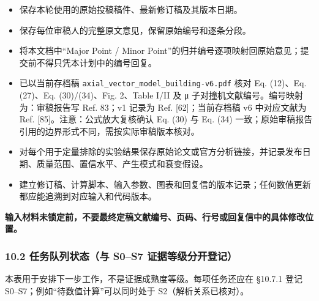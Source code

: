 \documentclass[
]{article}
\providecommand{\tightlist}{%
  \setlength{\itemsep}{0pt}\setlength{\parskip}{0pt}}
\begin{document}
\begin{itemize}
\tightlist
\item[$\square$]
  保存本轮使用的原始投稿稿件、最新修订稿及其版本日期。
\item[$\square$]
  保存每位审稿人的完整原文意见，保留原始编号和逐条分段。
\item[$\square$]
  将本文档中``Major Point / Minor
  Point''的归并编号逐项映射回原始意见；提交前不得只凭本计划中的编号回复。
\item[$\boxtimes$]
  已以当前存档稿 \texttt{axial\_vector\_model\_building-v6.pdf} 核对 Eq.
  (12)、Eq. (27)、Eq. (30)/(34)、Fig. 2、Table I/II 及 μ
  子对撞机文献编号。编号映射为：审稿报告写 Ref. 83；v1 记录为 Ref.
  {[}62{]}；当前存档稿 v6 中对应文献为 Ref.
  {[}85{]}。注意：公式放大复核确认 Eq. (30) 与 Eq. (34)
  一致；原始审稿报告引用的边界形式不同，需按实际审稿版本核对。
\item[$\square$]
  对每个用于定量排除的实验结果保存原始论文或官方分析链接，并记录发布日期、质量范围、置信水平、产生模式和衰变假设。
\item[$\square$]
  建立修订稿、计算脚本、输入参数、图表和回复信的版本记录；任何数值更新都应能追溯到对应输入和代码版本。
\end{itemize}

\textbf{输入材料未锁定前，不要最终定稿文献编号、页码、行号或回复信中的具体修改位置。}

\subsubsection{10.2 任务队列状态（与 S0--S7
证据等级分开登记）}\label{ux4efbux52a1ux961fux5217ux72b6ux6001ux4e0e-s0s7-ux8bc1ux636eux7b49ux7ea7ux5206ux5f00ux767bux8bb0}

本表用于安排下一步工作，不是证据成熟度等级。每项任务还应在 §10.7.1 登记
S0--S7；例如``待数值计算''可以同时处于 S2（解析关系已核对）。
\end{document}
